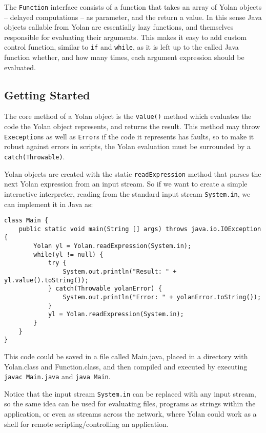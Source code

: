 \documentclass[11pt]{report}
\begin{document}
The \verb|Function| interface consists of a function that takes an array of Yolan objects -- delayed computations -- as parameter, and the return a value. In this sense Java objects callable from Yolan are essentially lazy functions, and themselves responsible for evaluating their arguments. This makes it easy to add custom control function, similar to \verb|if| and \verb|while|, as it is left up to the called Java function whether, and how many times, each argument expression should be evaluated.

\subsection{Getting Started}
The core method of a Yolan object is the \verb|value()| method which evaluates the code the Yolan object represents, and returns the result. This method may throw \verb|Exeception|s as well as \verb|Error|s if the code it represents has faults, so to make it robust against errors in scripts, the Yolan evaluation must be surrounded by a \verb|catch(Throwable)|.

Yolan objects are created with the static \verb|readExpression| method that parses the next Yolan expression from an input stream. So if we want to create a simple interactive interpreter, reading from the standard input stream \verb|System.in|, we can implement it in Java as: \begin{lstlisting}
class Main {
    public static void main(String [] args) throws java.io.IOException {
        Yolan yl = Yolan.readExpression(System.in);
        while(yl != null) {
            try {
                System.out.println("Result: " + yl.value().toString());
            } catch(Throwable yolanError) {
                System.out.println("Error: " + yolanError.toString());
            }
            yl = Yolan.readExpression(System.in);
        }
    }
}\end{lstlisting} 

This code could be saved in a file called Main.java, placed in a directory with Yolan.class and Function.class, and then compiled and executed by executing \verb|javac Main.java| and \verb|java Main|.

Notice that the input stream \verb|System.in| can be replaced with any input stream, so the same idea can be used for evaluating files, programs as strings within the application, or even as streams across the network, where Yolan could work as a shell for remote scripting/controlling an application.
\end{document}
